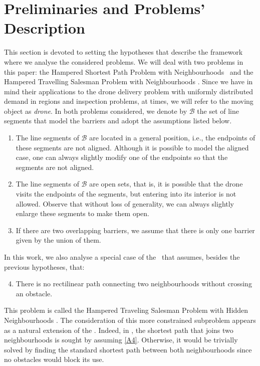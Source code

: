 \documentclass[a4paper,  review, authoryear, 1p., doubleblind]{elsarticle}
\newcommand{\SPPN}{{\sf{H-SPPN}\xspace }}
\newcommand{\TSPHN}{{\sf{H-TSPHN}\xspace }}
\newcommand{\TSPN}{{\sf{H-TSPN}\xspace }}
\begin{document}
	
	\section{Preliminaries and Problems'  Description \label{section:description}}
	This section is devoted to setting the hypotheses that describe the framework where we analyse the considered problems.
	We will deal with two problems in this paper: the Hampered Shortest Path Problem with Neighbourhoods \SPPN \ and the Hampered Travelling Salesman Problem with Neighbourhoods \TSPN. Since we have in mind their applications to the drone delivery problem with uniformly distributed demand in regions and inspection problems, at times, we will refer to the moving object as \textit{drone}. In both problems considered, we denote by $\mathcal{B}$ the set of line segments that model the barriers and adopt the assumptions listed below.
	
	\begin{enumerate}[label=\textbf{A\arabic*},ref=\textbf{A\arabic*}]
		\item \label{A1}The line segments of $\mathcal B$ are located in a general position, i.e., the endpoints of these segments are not aligned. Although it is possible to model the aligned case, one can always slightly modify one of the endpoints so that the segments are not aligned.
		\item The line segments of $\mathcal B$ are open sets, that is, it is possible that the drone visits the endpoints of the segments, but entering into its interior is not allowed. Observe that without loss of generality, we can always slightly enlarge these segments to make them open.
		\item \label{A3}If there are two overlapping barriers, we assume that there is only one barrier given by the union of them.
	\end{enumerate}
	
	In this work, we also analyse a special case of the \TSPN \ that assumes, besides the previous hypotheses, that:
	\begin{enumerate}[label=\textbf{A\arabic*}, ref=\textbf{A\arabic*}]
		\setcounter{enumi}{3}
		\item \label{A4}There is no rectilinear path connecting two neighbourhoods without crossing an obstacle.
	\end{enumerate} 
	This problem is called the Hampered Traveling Salesman Problem with Hidden Neighbourhoods \TSPHN. The consideration of this more constrained subproblem appears as a natural extension of the \SPPN. Indeed, in \SPPN, the shortest path that joins two neighbourhoods is sought by assuming \ref{A4}. Otherwise, it would be trivially solved by finding the standard shortest path between both neighbourhoods since no obstacles would block its use.
	
\end{document}
